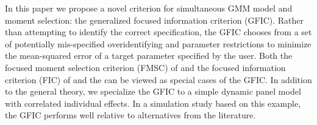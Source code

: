 In this paper we propose a novel criterion for simultaneous GMM model and moment selection: the generalized focused information criterion (GFIC). 
Rather than attempting to identify the correct specification, the GFIC chooses from a set of potentially mis-specified overidentifying and parameter restrictions to minimize the mean-squared error of a target parameter specified by the user. 
Both the focused moment selection criterion (FMSC) of \cite{DiTraglia2012} and the focused information criterion (FIC) of \cite{ClaeskensHjort2003} and the can be viewed as special cases of the GFIC. 
In addition to the general theory, we specialize the GFIC to a simple dynamic panel model with correlated individual effects. 
In a simulation study based on this example, the GFIC performs well relative to alternatives from the literature.

